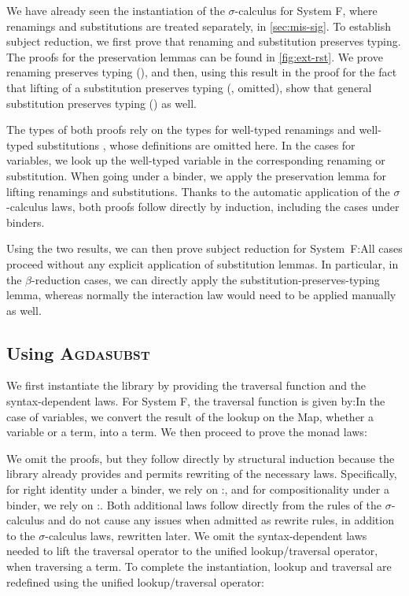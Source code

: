 \documentclass[screen,nonacm]{acmart}
\begin{document}
We have already seen the instantiation of the $σ$-calculus for System F, where
renamings and substitutions are treated separately, in \cref{sec:mis-sig}. To
establish subject reduction, we first prove that renaming and substitution
preserves typing. The proofs for the preservation lemmas can be found in
\cref{fig:ext-rst}. We prove renaming preserves typing
(), and then, using this result in the proof for the fact
that lifting of a substitution preserves typing (, omitted),
show that general substitution preserves typing () as
well.

The types of both proofs rely on the types for well-typed renamings \EWTR{} and
well-typed substitutions \EWTS{}, whose definitions are omitted here. In the
cases for variables, we look up the well-typed variable in the corresponding
renaming or substitution. When going under a binder, we apply the preservation
lemma for lifting renamings and substitutions. Thanks to the automatic
application of the $σ$-calculus laws, both proofs follow directly by induction,
including the cases under binders.

Using the two results, we can then prove subject reduction for
System~F:\ESR{}All cases proceed without any explicit application of
substitution lemmas. In particular, in the $β$-reduction cases, we can directly
apply the substitution-preserves-typing lemma, whereas normally the interaction
law would need to be applied manually as well.

\subsection*{Using \textsc{Agdasubst}}
We first instantiate the library by providing the traversal function and the
syntax-dependent laws. For System F, the traversal function is given
by:\SFTraversal{}In the case of variables, we convert the result of the lookup
on the Map, whether a variable or a term, into a term. We then proceed to prove
the monad laws:

\noindent\begin{minipage}[t]{0.48\linewidth}
      \small
      \raggedright{}
      \SFId{}
\end{minipage}
\begin{minipage}[t]{0.48\linewidth}
      \small
      \raggedright{}
      \SFCompo{}
\end{minipage}

\noindent We omit the proofs, but they follow directly by structural induction because
the library already provides and permits rewriting of the necessary laws.
Specifically, for right identity under a binder, we rely on
\;:\;\AIdLift{}, and for compositionality under a binder,
we rely on \;:\;\ADistLift{}. Both additional laws
follow directly from the rules of the $σ$-calculus and do not cause any issues
when admitted as rewrite rules, in addition to the $σ$-calculus laws, rewritten
later. We omit the syntax-dependent laws needed to lift the traversal operator
to the unified lookup/traversal operator, when traversing a term. To complete
the instantiation, lookup and traversal are redefined using the unified
lookup/traversal operator:
\end{document}
